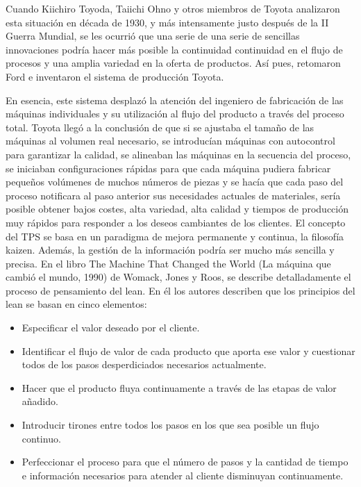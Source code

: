 Cuando Kiichiro Toyoda, Taiichi Ohno y otros miembros de Toyota analizaron esta situación en década de 1930, y más intensamente justo después de la II Guerra Mundial, se les ocurrió que una serie de una serie de sencillas innovaciones podría hacer más posible la continuidad continuidad en el flujo de procesos y una amplia variedad en la oferta de productos.
Así pues, retomaron Ford e inventaron el sistema de producción Toyota.

En esencia, este sistema desplazó la atención del ingeniero de fabricación de las máquinas individuales y su utilización al flujo del producto a través del proceso total.
Toyota llegó a la conclusión de que si se ajustaba el tamaño de las máquinas al volumen real necesario, se introducían máquinas con autocontrol para garantizar la calidad, se alineaban las máquinas en la secuencia del proceso, se iniciaban configuraciones rápidas para que cada máquina pudiera fabricar pequeños volúmenes de muchos números de piezas y se hacía que cada paso del proceso notificara al paso anterior sus necesidades actuales de materiales, sería posible obtener bajos costes, alta variedad, alta calidad y tiempos de producción muy rápidos para responder a los deseos cambiantes de los clientes.
El concepto del TPS se basa en un paradigma de mejora permanente y continua, la filosofía kaizen.
Además, la gestión de la información podría ser mucho más sencilla y precisa. En el libro The Machine That Changed the World (La máquina que cambió el mundo, 1990) de Womack, Jones y Roos, se describe detalladamente el proceso de pensamiento del lean. En él los autores describen que los principios del lean se basan en cinco elementos:

\begin{itemize}
    \item Especificar el valor deseado por el cliente.
    \item Identificar el flujo de valor de cada producto que aporta ese valor y cuestionar todos de los pasos desperdiciados necesarios actualmente.
    \item Hacer que el producto fluya continuamente a través de las etapas de valor añadido.
    \item Introducir tirones entre todos los pasos en los que sea posible un flujo continuo.
    \item Perfeccionar el proceso para que el número de pasos y la cantidad de tiempo e información necesarios para atender al cliente disminuyan continuamente.
\end{itemize}

